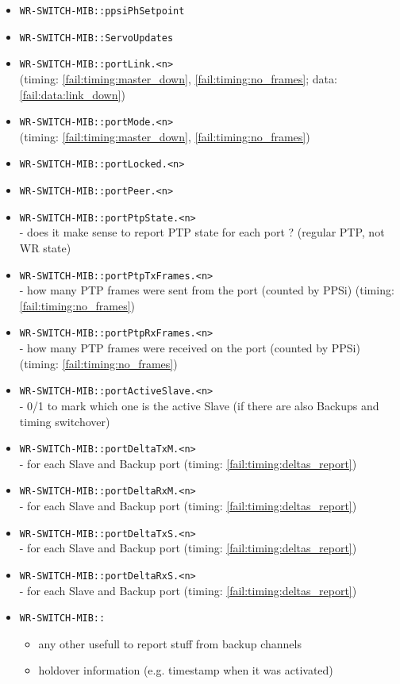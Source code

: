 \begin{itemize}[leftmargin=0pt]
	\item [] \texttt{WR-SWITCH-MIB::ppsiPhSetpoint}
	\item [] \texttt{WR-SWITCH-MIB::ServoUpdates}
	\item [] \texttt{WR-SWITCH-MIB::portLink.<n>}\\ (timing:
		\ref{fail:timing:master_down}, \ref{fail:timing:no_frames}; data:
		\ref{fail:data:link_down})
	\item [] \texttt{WR-SWITCH-MIB::portMode.<n>}\\ (timing:
		\ref{fail:timing:master_down}, \ref{fail:timing:no_frames})
	\item [] \texttt{WR-SWITCH-MIB::portLocked.<n>}
	\item [] \texttt{WR-SWITCH-MIB::portPeer.<n>}
	\item [] \texttt{WR-SWITCH-MIB::portPtpState.<n>}\\ - does it make sense to
		report PTP state for each port ? (regular PTP, not WR state)
	\item [] \texttt{WR-SWITCH-MIB::portPtpTxFrames.<n>}\\ - how many PTP frames
		were sent from the port (counted by PPSi) (timing:
		\ref{fail:timing:no_frames})
	\item [] \texttt{WR-SWITCH-MIB::portPtpRxFrames.<n>}\\ - how many PTP frames
		were received on the port (counted by PPSi) (timing:
		\ref{fail:timing:no_frames})
	\item [] \texttt{WR-SWITCH-MIB::portActiveSlave.<n>}\\ - 0/1 to mark which one
		is the active Slave (if there are also Backups and timing switchover)
	\item [] \texttt{WR-SWITCh-MIB::portDeltaTxM.<n>}\\ - for each Slave and
		Backup port (timing: \ref{fail:timing:deltas_report})
	\item [] \texttt{WR-SWITCH-MIB::portDeltaRxM.<n>}\\ - for each Slave and
		Backup port (timing: \ref{fail:timing:deltas_report})
	\item [] \texttt{WR-SWITCH-MIB::portDeltaTxS.<n>}\\ - for each Slave and
		Backup port (timing: \ref{fail:timing:deltas_report})
	\item [] \texttt{WR-SWITCH-MIB::portDeltaRxS.<n>}\\ - for each Slave and
		Backup port (timing: \ref{fail:timing:deltas_report})
	\item [] \texttt{WR-SWITCH-MIB::}
		\begin{itemize}[topsep=-12pt]
			\item any other usefull to report stuff from backup channels
			\item holdover information (e.g. timestamp when it was activated)
		\end{itemize}
\end{itemize}

